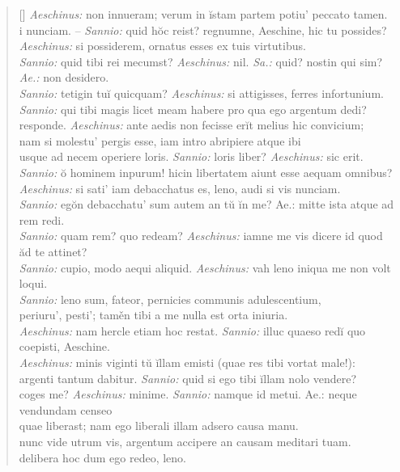 \begin{verse}[\versewidth]
    \textit{Aeschinus:} non innueram; verum in ĭstam partem potiu' peccato tamen.\\
    i nunciam. – \textit{Sannio:} quid hŏc reist? regnumne, Aeschine, hic tu possides?\\
    \textit{Aeschinus:} si possiderem, ornatus esses ex tuis virtutibus.\\
    \textit{Sannio:} quid tibi rei mecumst? \textit{Aeschinus:} nil. \textit{Sa.:} quid? nostin qui sim? \textit{Ae.:} non desidero.\\
    \textit{Sannio:} tetigin tuĭ quicquam? \textit{Aeschinus:} si attigisses, ferres infortunium.\\
    \textit{Sannio:} qui tibi magis licet meam habere pro qua ego argentum dedi?\\
    responde. \textit{Aeschinus:} ante aedis non fecisse erĭt melius hic convicium;\\
    nam si molestu' pergis esse, iam intro abripiere atque ibi\\
    usque ad necem operiere loris. \textit{Sannio:} loris liber? \textit{Aeschinus:} sic erit.\\
    \textit{Sannio:} ŏ hominem inpurum! hicin libertatem aiunt esse aequam omnibus?\\
    \textit{Aeschinus:} si sati' iam debacchatus es, leno, audi si vis nunciam.\\
     \textit{Sannio:} egŏn debacchatu' sum autem an tŭ ĭn me? Ae.: mitte ista atque ad rem redi.\\
    \textit{Sannio:} quam rem? quo redeam? \textit{Aeschinus:} iamne me vis dicere id quod ăd te attinet?\\
    \textit{Sannio:} cupio, modo aequi aliquid. \textit{Aeschinus:} vah leno iniqua me non volt loqui.\\
    \textit{Sannio:} leno sum, fateor, pernicies communis adulescentium,\\
    periuru', pesti'; taměn tibi a me nulla est orta iniuria.\\
     \textit{Aeschinus:} nam hercle etiam hoc restat. \textit{Sannio:} illuc quaeso redĭ quo coepisti, Aeschine.\\
    \textit{Aeschinus:} minis viginti tŭ ĭllam emisti (quae res tibi vortat male!):\\
    argenti tantum dabitur. \textit{Sannio:} quid si ego tibi ĭllam nolo vendere?\\
    coges me? \textit{Aeschinus:} minime. \textit{Sannio:} namque id metui. Ae.: neque vendundam censeo\\
    quae liberast; nam ego liberali illam adsero causa manu.\\
    nunc vide utrum vis, argentum accipere an causam meditari tuam.\\
    delibera hoc dum ego redeo, leno.\\


\end{verse}
